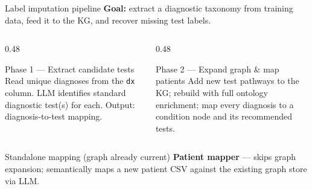\documentclass[aspectratio=169]{beamer}
\begin{document}
\begin{frame}{Label imputation pipeline}
  \textbf{Goal:} extract a diagnostic taxonomy from training data,
  feed it to the KG, and recover missing test labels.

  \vspace{0.5em}
  \begin{columns}[T]
    \begin{column}{0.48\textwidth}
      \begin{block}{Phase 1 --- Extract candidate tests}
        \small
        Read unique diagnoses from the \texttt{dx} column.
        LLM identifies standard diagnostic test(s) for each.
        Output: diagnosis-to-test mapping.
      \end{block}
    \end{column}
    \begin{column}{0.48\textwidth}
      \begin{block}{Phase 2 --- Expand graph \& map patients}
        \small
        Add new test pathways to the KG; rebuild with full
        ontology enrichment; map every diagnosis to a condition
        node and its recommended tests.
      \end{block}
    \end{column}
  \end{columns}

  \vspace{0.5em}
  \begin{block}{Standalone mapping (graph already current)}
    \small
    \textbf{Patient mapper} --- skips graph expansion; semantically maps a
    new patient CSV against the existing graph store via LLM.
  \end{block}
\end{frame}

\end{document}
